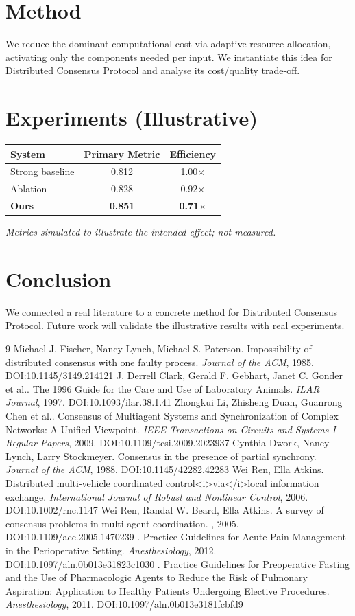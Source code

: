 \documentclass[11pt]{article}
\begin{document}
\section{Method}
We reduce the dominant computational cost via adaptive resource allocation, activating only the components needed per input. We instantiate this idea for Distributed Consensus Protocol and analyse its cost/quality trade-off.

\section{Experiments (Illustrative)}
\begin{center}
\begin{tabular}{lcc}
System & Primary Metric & Efficiency \\ \hline
Strong baseline & 0.812 & 1.00$\times$ \\
Ablation & 0.828 & 0.92$\times$ \\
\textbf{Ours} & \textbf{0.851} & \textbf{0.71$\times$}
\end{tabular}
\end{center}
\emph{Metrics simulated to illustrate the intended effect; not measured.}

\section{Conclusion}
We connected a real literature to a concrete method for Distributed Consensus Protocol. Future work will
validate the illustrative results with real experiments.

\begin{thebibliography}{9}
 Michael J. Fischer, Nancy Lynch, Michael S. Paterson. Impossibility of distributed consensus with one faulty process. \emph{Journal of the ACM}, 1985. DOI:10.1145/3149.214121
 J. Derrell Clark, Gerald F. Gebhart, Janet C. Gonder et al.. The 1996 Guide for the Care and Use of Laboratory Animals. \emph{ILAR Journal}, 1997. DOI:10.1093/ilar.38.1.41
 Zhongkui Li, Zhisheng Duan, Guanrong Chen et al.. Consensus of Multiagent Systems and Synchronization of Complex Networks: A Unified Viewpoint. \emph{IEEE Transactions on Circuits and Systems I Regular Papers}, 2009. DOI:10.1109/tcsi.2009.2023937
 Cynthia Dwork, Nancy Lynch, Larry Stockmeyer. Consensus in the presence of partial synchrony. \emph{Journal of the ACM}, 1988. DOI:10.1145/42282.42283
 Wei Ren, Ella Atkins. Distributed multi‐vehicle coordinated control<i>via</i>local information exchange. \emph{International Journal of Robust and Nonlinear Control}, 2006. DOI:10.1002/rnc.1147
 Wei Ren, Randal W. Beard, Ella Atkins. A survey of consensus problems in multi-agent coordination. \emph{}, 2005. DOI:10.1109/acc.2005.1470239
 . Practice Guidelines for Acute Pain Management in the Perioperative Setting. \emph{Anesthesiology}, 2012. DOI:10.1097/aln.0b013e31823c1030
 . Practice Guidelines for Preoperative Fasting and the Use of Pharmacologic Agents to Reduce the Risk of Pulmonary Aspiration: Application to Healthy Patients Undergoing Elective Procedures. \emph{Anesthesiology}, 2011. DOI:10.1097/aln.0b013e3181fcbfd9
\end{thebibliography}
\end{document}
